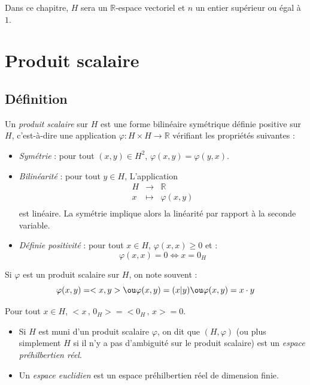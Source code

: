 \documentclass[a4paper,10pt]{report}
\begin{document}


\noindent Dans ce chapitre, $H$ sera un $\mathbb{R}$-espace vectoriel et $n$ un entier supérieur ou égal à $1$.

\section{Produit scalaire}
\subsection{Définition}
\begin{defin} Un \textit{produit scalaire} sur $H$ est une forme bilinéaire symétrique définie positive sur $H$, c'est-à-dire une application $\varphi : H \times H \rightarrow \mathbb{R}$ vérifiant les propriétés suivantes :

\begin{itemize}
\item \textit{Symétrie} : pour tout $(x,y) \in H^2$, $\varphi(x,y)= \varphi(y,x)$.
\item \textit{Bilinéarité} : pour tout $y \in H$, L'application 
$$ \begin{array}{ccl}
H & \rightarrow & \mathbb{R} \\
x & \mapsto & \varphi(x,y) \\
\end{array}$$
est linéaire. La symétrie implique alors la linéarité par rapport à la seconde variable.
\item \textit{Définie positivité} : pour tout $x \in H$, $\varphi(x,x) \geq 0$ et :
$$ \varphi(x,x) = 0 \Longleftrightarrow x = 0_H $$
\end{itemize}
\end{defin}

\begin{rems}
\item Si $\varphi$ est un produit scalaire sur $H$, on note souvent :
$$ \varphi(x,y) = <x,y>  \ou \varphi(x,y) = (x \vert y) \ou \varphi(x,y)=x \cdot y$$
\item Pour tout $x \in H$, $<x  \,  , \, 0_H > =<0_H  \,  , \, x > = 0$.
\end{rems}

\begin{defin} 
\begin{itemize}
\item Si $H$ est muni d'un produit scalaire $\varphi$, on dit que $(H, \varphi)$ (ou plus simplement $H$ si il n'y a pas d'ambiguité sur le produit scalaire) est un \textit{espace préhilbertien réel}.
\item Un\textit{ espace euclidien} est un espace préhilbertien réel de dimension finie.
\end{itemize}
\end{defin}
\end{document}
